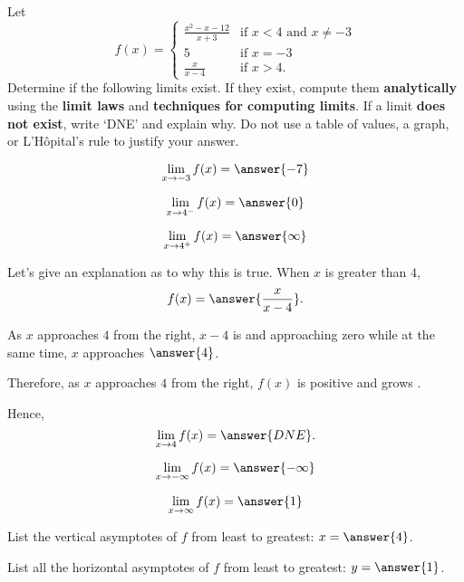 \documentclass{ximera}
\author{Nela Lakos \and Kyle Parsons}
\begin{document}
Let 
\[
f(x)=\begin{cases}
\frac{x^2-x-12}{x+3} & \text{if $x<4$ and $x\ne -3$}\\
5 & \text{if $x=-3$}\\
\frac{x}{x-4} & \text{if $x>4$}.
\end{cases}
\]
Determine if the following limits exist. If they exist, compute them \textbf{analytically} using the \textbf{limit laws} and \textbf{techniques for computing limits}. If a limit \textbf{does not exist}, write `DNE' and explain why.  Do not use a table of values, a graph, or L'H\^opital's rule to justify your answer.
\begin{exercise}
  \[
  \lim_{x\to -3}f(x)=\answer{-7}
  \]
\end{exercise}
\begin{exercise}
  \[
  \lim_{x\to 4^{-}}f(x)=\answer{0}
  \]
\end{exercise}
\begin{exercise}
  \[
  \lim_{x\to 4^+}f(x)=\answer{\infty}
  \]
  \begin{exercise}
    Let's give an explanation as to why this is true. When $x$ is
    greater than $4$,
    \[
    f(x) = \answer{\frac{x}{x-4}}.
    \]
    \begin{exercise}As $x$ approaches $4$ from the right, $x-4$ is  and approaching zero while at the same time, $x$ approaches $\answer{4}$. \begin{exercise} Therefore, as $x$ approaches $4$ from the right, $f(x)$ is positive and grows . \begin{exercise} Hence, 
    \[
    \lim_{x\to 4}f(x)=\answer{DNE}.
    \]
    \end{exercise}
    \end{exercise}
    \end{exercise}
    \end{exercise}   
  \begin{exercise}
  \[
  \lim_{x\to-\infty}f(x)=\answer{-\infty}
  \]
  \end{exercise} 
  \begin{exercise}
  \[
  \lim_{x\to\infty}f(x)=\answer{1}
  \]
  \end{exercise}
  \begin{exercise}
    List the vertical asymptotes of $f$ from least to greatest: $x=\answer{4}$.
  \end{exercise}
  \begin{exercise}
    List all the horizontal asymptotes of $f$ from least to greatest: $y=\answer{1}$.
  \end{exercise}
\end{exercise}
\end{document}

